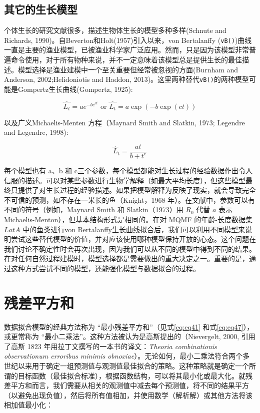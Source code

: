 \documentclass[
  lang=cn,
  11pt,
  scheme=chinese,
  chinesefont=nofont,
  citestyle=gb7714-2015,
  bibstyle=gb7714-2015]{elegantbook}
\begin{document}
\subsection{其它的生长模型}\label{ux5176ux5b83ux7684ux751fux957fux6a21ux578b}

个体生长的研究文献很多，描述生物体生长的模型多种多样(Schnute and Richards, 1990)。自Beverton和Holt(1957)引入以来，von Bertalanffy (\texttt{vB()})曲线一直是主要的渔业模型，已被渔业科学家广泛应用。然而，只是因为该模型非常普遍命令使用，对于所有物种来说，并不一定意味着该模型总是提供生长的最佳描述。模型选择是渔业建模中一个至关重要但经常被忽视的方面(Burnham and Anderson, 2002;Helidoniotis and Haddon, 2013)。这里两种替代\texttt{vB()}的两种模型可能是Gompertz生长曲线(Gompertz, 1925):

\begin{equation}
\hat{L_t} =ae^{-be^{ct}} \text{ or } \hat{L_t}=a \exp(-b \exp(ct)) 
\label{eq:eq45}
\end{equation}

以及广义Michaelis-Menten 方程（Maynard Smith and Slatkin, 1973; Legendre and Legendre, 1998):

\begin{equation}  
{{\hat{L}}_{t}}=\frac{at}{b+{{t}^{c}}}  
\label{eq:eq46}  
\end{equation}

每个模型也有 a、b 和 c三个参数，每个模型都能对生长过程的经验数据作出令人信服的描述。可以对某些参数进行生物学解释（如最大平均长度），但这些模型最终只提供了对生长过程的经验描述。如果把模型解释为反映了现实，就会导致完全不可信的预测，如不存在一米长的鱼（Knight，1968 年）。在文献中，参数可以有不同的符号（例如，Maynard Smith 和 Slatkin（1973）用 \(R_0\) 代替 \(a\) 表示 Michaelis-Menton），但基本结构形式是相同的。在对 MQMF 的年龄-长度数据集 \(LatA\) 中的鱼类进行von Bertalanffy生长曲线拟合后，我们可以利用不同模型来说明尝试这些替代模型的价值，并对应该使用哪种模型保持开放的心态。这个问题在我们讨论不确定性时会再次出现，因为我们可以从不同的模型中得到不同的结果。在对任何自然过程建模时，模型选择都是需要做出的重大决定之一。重要的是，通过这种方式尝试不同的模型，还能强化模型与数据拟合的过程。

\section{残差平方和}\label{ux6b8bux5deeux5e73ux65b9ux548c}

数据拟合模型的经典方法称为 ``最小残差平方和''（见式\eqref{eq:eq41} 和式\eqref{eq:eq47}），或更常称为 ``最小二乘法''。这种方法被认为是高斯提出的（Nievergelt, 2000, 引用了高斯 1823 年用拉丁文撰写的一本书的译文：\emph{Theoria combinationis observationum erroribus minimis obnoxiae}）。无论如何，最小二乘法符合两个多世纪以来用于确定一组预测值与观测值最佳拟合的策略。这种策略就是确定一个所谓的目标函数（最佳拟合标准），根据函数结构，可以将其最小化或最大化。就残差平方和而言，我们需要从相关的观测值中减去每个预测值，将不同的结果平方（以避免出现负值），然后将所有值相加，并使用数学（解析解）或其他方法将该相加值最小化：
\end{document}
